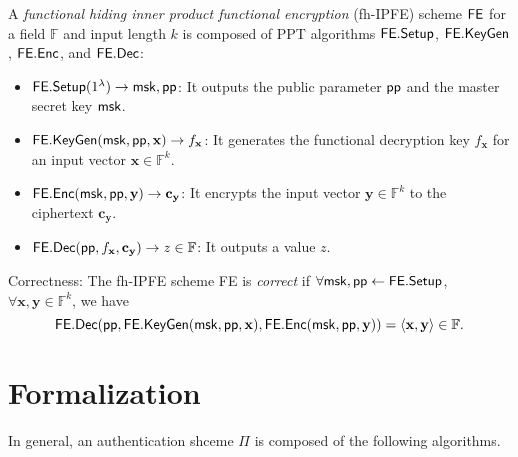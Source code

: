 \begin{definition}
\label{def:fh-IPFE}
	A \emph{functional hiding inner product functional encryption} (fh-IPFE) scheme $\sf FE$ for a field $\mathbb{F}$ and input length $k$ is composed of PPT algorithms ${\sf FE.Setup}$, ${\sf FE.KeyGen}$, ${\sf FE.Enc}$, and ${\sf FE.Dec}$:

\begin{itemize}

	\item ${\sf FE.Setup}(1^\lambda) \to {\sf msk}, {\sf pp}$: It outputs the public parameter ${\sf pp}$ and the master secret key ${\sf msk}$.

	\item ${\sf FE.KeyGen}({\sf msk}, {\sf pp}, \mathbf{x}) \to f_\mathbf{x}$: It generates the functional decryption key $f_\mathbf{x}$ for an input vector $\mathbf{x} \in \mathbb{F}^k$. 

	\item ${\sf FE.Enc}({\sf msk}, {\sf pp}, \mathbf{y}) \to \mathbf{c_y}$: It encrypts the input vector $\mathbf{y} \in \mathbb{F}^k$ to the ciphertext $\mathbf{c_y}$. 

	\item ${\sf FE.Dec}({\sf pp}, f_\mathbf{x}, \mathbf{c_y}) \to z \in \mathbb{F}$: It outputs a value $z$.

\end{itemize}

\noindent Correctness: The fh-IPFE scheme {\sf FE} is \emph{correct} if $\forall {\sf msk}, {\sf pp} \gets {\sf FE.Setup}$, $\forall \mathbf{x}, \mathbf{y} \in \mathbb{F}^k$, we have
	\[
		{\sf FE.Dec}( {\sf pp}, {\sf FE.KeyGen}({\sf msk}, {\sf pp}, \mathbf{x}), {\sf FE.Enc}({\sf msk}, {\sf pp}, \mathbf{y}) ) = \langle \mathbf{x} , \mathbf{y} \rangle \in \mathbb{F}.
	\]

\end{definition}


\section*{Formalization}
\label{sec:formalization}


In general, an authentication shceme $\Pi$ is composed of the following algorithms.

